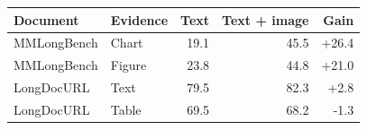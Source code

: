 \begin{table}[t]
\centering
\large
\begin{tabular}{@{}llrrr@{}}
\toprule
Document & Evidence & Text & Text + image & Gain \\
\midrule
MMLongBench & Chart & 19.1 & 45.5 & +26.4 \\
MMLongBench & Figure & 23.8 & 44.8 & +21.0 \\
LongDocURL & Text & 79.5 & 82.3 & +2.8 \\
LongDocURL & Table & 69.5 & 68.2 & -1.3 \\
\bottomrule
\end{tabular}
\end{table}
